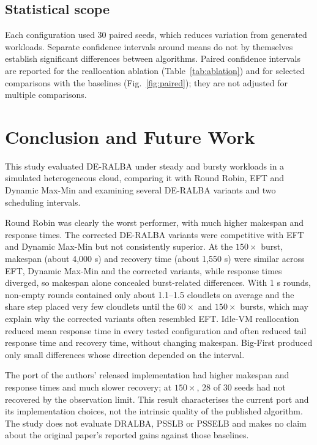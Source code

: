 \documentclass[default,sn-mathphys,Numbered]{sn-jnl}
\begin{document}
\subsection{Statistical scope}
Each configuration used 30 paired seeds, which reduces variation from generated workloads. Separate confidence intervals around means do not by themselves establish significant differences between algorithms. Paired confidence intervals are reported for the reallocation ablation (Table~\ref{tab:ablation}) and for selected comparisons with the baselines (Fig.~\ref{fig:paired}); they are not adjusted for multiple comparisons.

\section{Conclusion and Future Work}\label{sec:conclusion}
This study evaluated DE-RALBA under steady and bursty workloads in a simulated heterogeneous cloud, comparing it with Round Robin, EFT and Dynamic Max-Min and examining several DE-RALBA variants and two scheduling intervals.

Round Robin was clearly the worst performer, with much higher makespan and response times. The corrected DE-RALBA variants were competitive with EFT and Dynamic Max-Min but not consistently superior. At the $150\times$ burst, makespan (about 4,000 s) and recovery time (about 1,550 s) were similar across EFT, Dynamic Max-Min and the corrected variants, while response times diverged, so makespan alone concealed burst-related differences. With 1 s rounds, non-empty rounds contained only about 1.1--1.5 cloudlets on average and the share step placed very few cloudlets until the $60\times$ and $150\times$ bursts, which may explain why the corrected variants often resembled EFT. Idle-VM reallocation reduced mean response time in every tested configuration and often reduced tail response time and recovery time, without changing makespan. Big-First produced only small differences whose direction depended on the interval.

The port of the authors' released implementation had higher makespan and response times and much slower recovery; at $150\times$, 28 of 30 seeds had not recovered by the observation limit. This result characterises the current port and its implementation choices, not the intrinsic quality of the published algorithm. The study does not evaluate DRALBA, PSSLB or PSSELB and makes no claim about the original paper's reported gains against those baselines.
\end{document}
